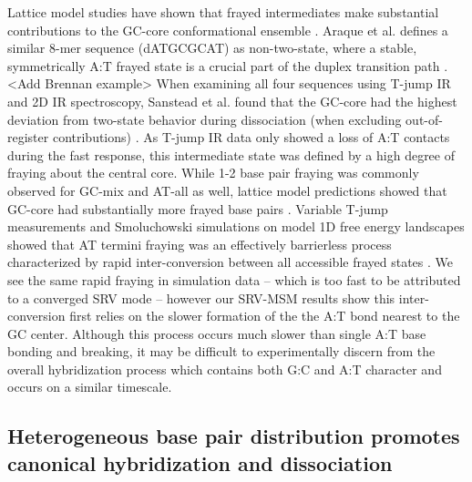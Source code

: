 \documentclass[journal=jpcbfk,manuscript=article]{achemso}
\begin{document}
Lattice model studies have shown that frayed intermediates make substantial contributions to the GC-core conformational ensemble \citep{Araque2016LatticeCooperativity, Phys2019}. Araque et al. defines a similar 8-mer sequence (dATGCGCAT) as non-two-state, where a stable, symmetrically A:T frayed state is a crucial part of the duplex transition path \citep{Araque2016LatticeCooperativity}. <Add Brennan example> When examining all four sequences using T-jump IR and 2D IR spectroscopy, Sanstead et al. found that the GC-core had the highest deviation from two-state behavior during dissociation (when excluding out-of-register contributions) \citep{Sanstead2016}. As T-jump IR data only showed a loss of A:T contacts during the fast response, this intermediate state was defined by a high degree of fraying about the central core. While 1-2 base pair fraying was commonly observed for GC-mix and AT-all as well, lattice model predictions showed that GC-core had substantially more frayed base pairs \citep{Phys2019}. Variable T-jump measurements and Smoluchowski simulations on model 1D free energy landscapes showed that AT termini fraying was an effectively barrierless process characterized by rapid inter-conversion between all accessible frayed states \citep{Sanstead2018DirectDehybridization}. We see the same rapid fraying in simulation data -- which is too fast to be attributed to a converged SRV mode -- however our SRV-MSM results show this inter-conversion first relies on the slower formation of the the A:T bond nearest to the GC center.  Although this process occurs much slower than single A:T base bonding and breaking, it may be difficult to experimentally discern from the overall hybridization process which contains both G:C and A:T character and occurs on a similar timescale.


\subsection{Heterogeneous base pair distribution promotes canonical hybridization and dissociation}
\end{document}
